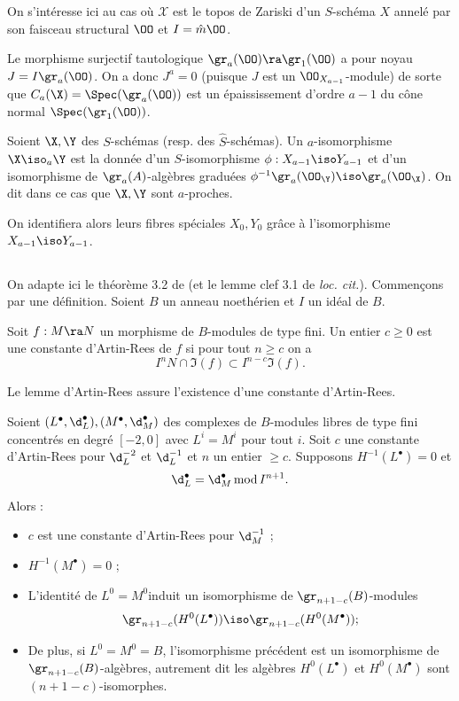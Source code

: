 \documentclass[10pt]{../fichiers-configuration-latex/smfart}
\begin{document}
On s'intéresse ici au cas où $\mathscr{X}$ est le topos de Zariski
d'un $S$-schéma $X$ annelé par son faisceau structural $\OO$
et $I=\hat m{\OO}$.

\begin{remarque}Le morphisme surjectif tautologique
$\gr_a(\OO)\ra\gr_1(\OO)$ a pour noyau $J=I\gr_a(\OO)$. On a donc
$J^a=0$ (puisque $J$ est un $\OO_{X_{a-1}}$-module) de sorte que
$C_a(\X)=\Spec(\gr_a(\OO))$ est un épaississement d'ordre $a-1$
du cône normal $\Spec(\gr_1(\OO))$.\end{remarque}


\begin{definition} Soient $\X,\Y$ des $S$-schémas (resp. des
$\hat S$-schémas). Un $a$-isomorphisme $\X\iso_a {{\Y}}$
est la donnée d'un $S$-isomorphisme $\phi:X_{a-1}\iso
Y_{a-1}$ et d'un isomorphisme de $\gr_a(A)$-algèbres graduées
$\phi^{-1}\gr_a(\OO_{{\Y}})\iso\gr_a(\OO_\X)$. On dit dans ce cas
que $\X,{{\Y}}$ sont $a$-proches. \end{definition}

On identifiera alors leurs fibres spéciales $X_0,Y_0$ grâce à
l'isomorphisme $X_{a-1}\iso Y_{a-1}$.



\subsection{} On adapte ici le théorème 3.2 de \cite{Con-deJ02}
(et le lemme clef 3.1 de \textit{loc. cit.}). Commençons par
une définition. Soient $B$ un anneau noethérien et $I$ un idéal
de $B$.

\begin{definition}\label{3-AR} Soit $f:M\ra N$ un morphisme de
$B$-modules de type fini. Un entier $c\geq 0$ est une constante
d'Artin-Rees de $f$ si pour tout $n\geq c$ on a $${{I}}^nN\cap
\Im(f)\subset {{I}}^{n-c}\Im(f).$$\end{definition}

Le lemme d'Artin-Rees assure l'existence d'une constante
d'Artin-Rees.


\begin{proposition}\label{3-CdJ} Soient
$(L^\bullet,\d_L^\bullet),(M^\bullet,\d_M^\bullet)$ des
complexes de $B$-modules libres de type fini concentrés
en degré $[-2,0]$ avec $L^i=M^i$ pour tout $i$. Soit $c$
une constante d'Artin-Rees pour $\d_L^{-2}$ et $\d_L^{-1}$
et $n$ un entier $\geq c$. Supposons $H^{-1}(L^\bullet)=0$ et
$$\d_L^\bullet=\d_M^\bullet\mod I^{n+1}.$$ Alors : \begin{itemize}
\item[(i)] $c$ est une constante d'Artin-Rees pour $\d_M^{-1}$
; \item[(ii)] $H^{-1}(M^\bullet)=0$ ; \item[(iii)] L'identité
de $L^0=M^0$induit un isomorphisme de $\gr_{n+1-c}(B)$-modules
$$\gr_{n+1-c}(H^{0}(L^\bullet))\iso\gr_{n+1-c}(H^{0}(M^\bullet)) ;$$
\item[(iv)] De plus, si $L^0=M^0=B$, l'isomorphisme précédent
est un isomorphisme de $\gr_{n+1-c}(B)$-algèbres, autrement
dit les algèbres $H^{0}(L^\bullet)$ et $H^{0}(M^\bullet)$ sont
$(n+1-c)$-isomorphes.  \end{itemize} \end{proposition}
\end{document}
